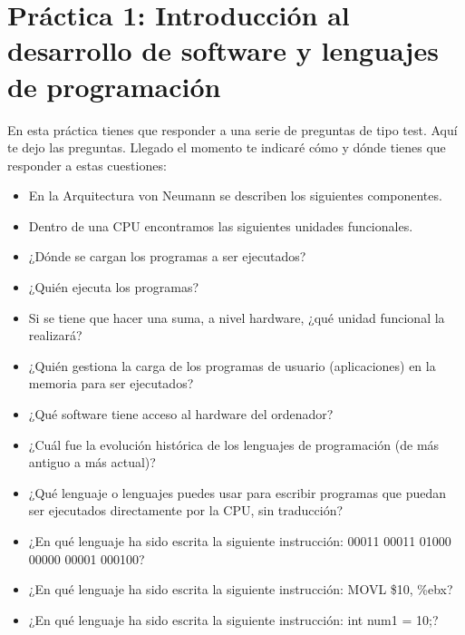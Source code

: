 \documentclass[letterpaper,10pt,spanish]{sphinxmanual}
\begin{document}
\chapter{Práctica 1: Introducción al desarrollo de software y lenguajes de programación}
\label{\detokenize{practica1:practica-1-introduccion-al-desarrollo-de-software-y-lenguajes-de-programacion}}\label{\detokenize{practica1::doc}}
\sphinxAtStartPar
En esta práctica tienes que responder a una serie de preguntas de tipo test. Aquí te dejo las preguntas. Llegado el momento te indicaré cómo y dónde tienes que responder a estas cuestiones:
\begin{itemize}
\item {} 
\sphinxAtStartPar
En la Arquitectura von Neumann se describen los siguientes componentes.

\item {} 
\sphinxAtStartPar
Dentro de una CPU encontramos las siguientes unidades funcionales.

\item {} 
\sphinxAtStartPar
¿Dónde se cargan los programas a ser ejecutados?

\item {} 
\sphinxAtStartPar
¿Quién ejecuta los programas?

\item {} 
\sphinxAtStartPar
Si se tiene que hacer una suma, a nivel hardware, ¿qué unidad funcional la realizará?

\item {} 
\sphinxAtStartPar
¿Quién gestiona la carga de los programas de usuario (aplicaciones) en la memoria para ser ejecutados?

\item {} 
\sphinxAtStartPar
¿Qué software tiene acceso al hardware del ordenador?

\item {} 
\sphinxAtStartPar
¿Cuál fue la evolución histórica de los lenguajes de programación (de más antiguo a más actual)?

\item {} 
\sphinxAtStartPar
¿Qué lenguaje o lenguajes puedes usar para escribir programas que puedan ser ejecutados directamente por la CPU, sin traducción?

\item {} 
\sphinxAtStartPar
¿En qué lenguaje ha sido escrita la siguiente instrucción: 00011 00011 01000 00000 00001 000100?

\item {} 
\sphinxAtStartPar
¿En qué lenguaje ha sido escrita la siguiente instrucción: MOVL \$10, \%ebx?

\item {} 
\sphinxAtStartPar
¿En qué lenguaje ha sido escrita la siguiente instrucción: int num1 = 10;?

\end{itemize}
\end{document}

